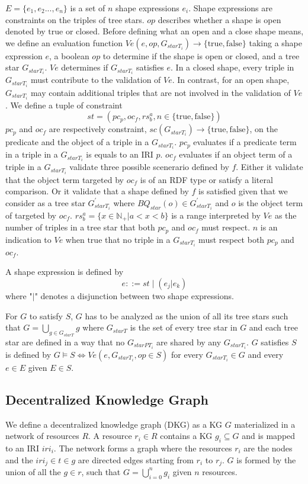 $E = \{e_1, e_2 ..., e_{n}\}$ is a set of $n$ shape expressions $e_i$.
Shape expressions are constraints on the triples of tree stars.
$op$ describes whether a shape is open denoted by $\mathrm{true}$ or closed.
Before defining what an open and a close shape means, we define an evaluation function 
$Ve(e, op, G_{starT_i}) \rightarrow \{\mathrm{true}, \mathrm{false} \}$
taking a shape expression $e$, a boolean $op$ to determine if the shape is open or closed, and a tree star $G_{starT_i}$.
$Ve$ determines if $G_{starT_i}$ satisfies $e$.
In a closed shape, every triple in $G_{starT_i}$ must contribute to the validation of $Ve$.
In contrast, for an open shape, $G_{starT_i}$ may contain additional triples that are not involved in the validation of $Ve$.
We define a tuple of constraint
\begin{equation}
    st = (pc_p, oc_f, rs^a_b, n \in \{\mathrm{true}, \mathrm{false}\})
\end{equation}
$pc_p$ and $oc_f$ are respectively constraint,
$sc(G_{starT_i})  \rightarrow \{\mathrm{true}, \mathrm{false}\}$,
on the predicate and the object of a triple in a $G_{starT_i}$.
$pc_p$ evaluates if a predicate term in a triple in a $G_{starT_i}$ is equals to an IRI $p$.
$oc_f$ evaluates if an object term of a triple in a $G_{starT_i}$ validate three possible scenerario defined by $f$.
Either it validate that the object term targeted by $oc_f$ is of an RDF type or satisfy a literal comparison.
Or it validate that a shape defined by $f$ is satisfied given that we consider as a tree star 
$G_{starT_i}^{\prime}$ where $BQ_{star}(o) \in G_{starT_i}^{\prime}$ and $o$ is the object term of targeted by $oc_f$.
$rs^a_b = \{x \in \mathbb{N}_+ | a < x < b \}$ is a range interpreted by $Ve$ as the number of triples in a tree star that both $pc_p$ and $oc_f$ must respect.
$n$ is an indication to $Ve$ when $\mathrm{true}$ that no triple in a $G_{starT_i}$ must respect both $pc_p$ and $oc_f$. 

A shape expression is defined by
\begin{equation}
 e ::= st \mid (e_j|e_k)
\end{equation}
where "$|$" denotes a disjunction between two shape expressions.

For $G$ to satisfy $S$, $G$ has to be analyzed as the union of all its tree stars such that $G = \bigcup_{g \in G_{starT}} g$ where $G_{starT}$ is the set of every tree star in $G$
and each tree star are defined in a way that no $G_{starPT_i}$ are shared by any $G_{starT_i}$.
$G$ satisfies $S$ is defined by $G \models S \iff Ve(e,G_{starT_i}, op\in S)$  for every $G_{starT_i} \in G$ and every $e \in E$ given $E \in S$.

\subsection{Decentralized Knowledge Graph}
We define a decentralized knowledge graph (DKG) as a KG $G$ materialized in a network of resources $R$.
A resource $r_i \in R$ contains a KG $g_i \subseteq G$ and is mapped to an IRI $iri_i$.
The network forms a graph where the resources $r_i$ are the nodes and the $iri_j \in t \in g$ are directed edges starting from $r_i$ to $r_j$.
$G$ is formed by the union of all the $g \in r$, such that $G = \bigcup_{i=0}^{n}g_i$ given $n$ resources.